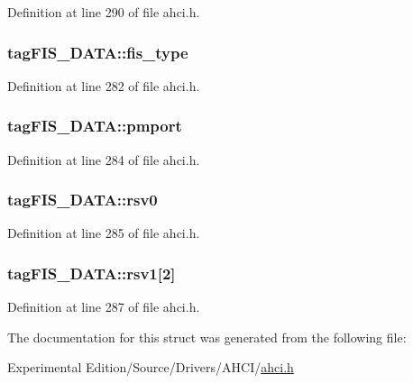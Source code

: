 Definition at line 290 of file ahci.\+h.

\subsubsection[{\texorpdfstring{fis\+\_\+type}{fis_type}}]{ tag\+F\+I\+S\+\_\+\+D\+A\+T\+A\+::fis\+\_\+type}\hypertarget{structtagFIS__DATA_abb427e86d341bee8aeca526b9c3a6990}{}\label{structtagFIS__DATA_abb427e86d341bee8aeca526b9c3a6990}


Definition at line 282 of file ahci.\+h.

\subsubsection[{\texorpdfstring{pmport}{pmport}}]{ tag\+F\+I\+S\+\_\+\+D\+A\+T\+A\+::pmport}\hypertarget{structtagFIS__DATA_ae7d98fe7684becad3fe600e1fa4b0fb5}{}\label{structtagFIS__DATA_ae7d98fe7684becad3fe600e1fa4b0fb5}


Definition at line 284 of file ahci.\+h.

\subsubsection[{\texorpdfstring{rsv0}{rsv0}}]{ tag\+F\+I\+S\+\_\+\+D\+A\+T\+A\+::rsv0}\hypertarget{structtagFIS__DATA_ad3600f99fbe5de9ecbdf18b8260976f9}{}\label{structtagFIS__DATA_ad3600f99fbe5de9ecbdf18b8260976f9}


Definition at line 285 of file ahci.\+h.

\subsubsection[{\texorpdfstring{rsv1}{rsv1}}]{ tag\+F\+I\+S\+\_\+\+D\+A\+T\+A\+::rsv1\mbox{[}2\mbox{]}}\hypertarget{structtagFIS__DATA_a03522bbeeea5fb2b2fff06cafb32076a}{}\label{structtagFIS__DATA_a03522bbeeea5fb2b2fff06cafb32076a}


Definition at line 287 of file ahci.\+h.



The documentation for this struct was generated from the following file\+:\begin{DoxyCompactItemize}
\item 
Experimental Edition/\+Source/\+Drivers/\+A\+H\+C\+I/\hyperlink{ahci_8h}{ahci.\+h}\end{DoxyCompactItemize}
